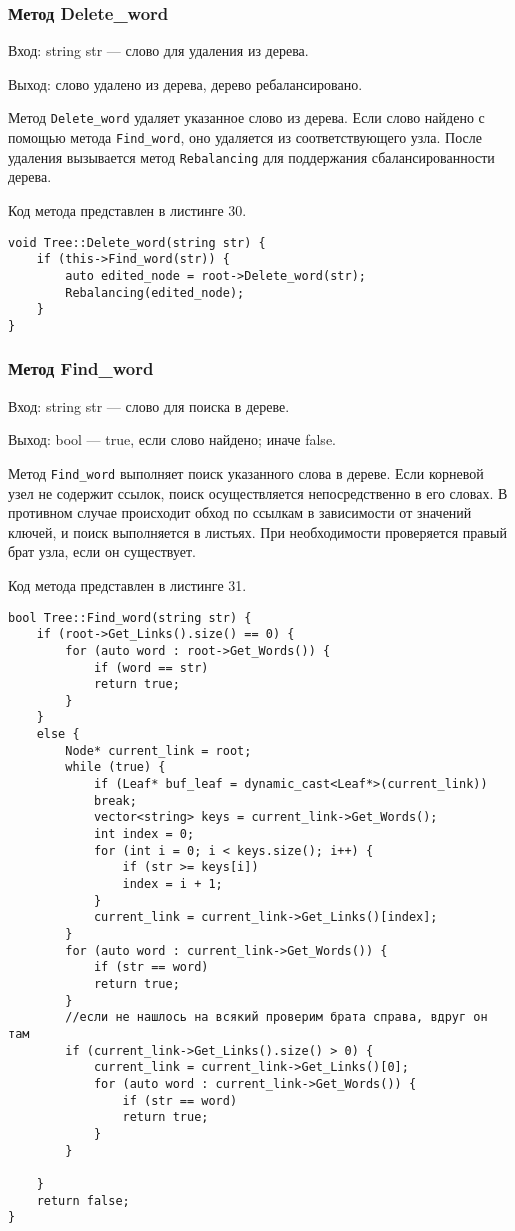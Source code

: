 \documentclass[10pt,a4paper,final]{article} %
\begin{document}
\subsubsection{Метод Delete\_word} 
Вход: string str — слово для удаления из дерева. \par
Выход: слово удалено из дерева, дерево ребалансировано. \par
\par Метод \texttt{Delete\_word} удаляет указанное слово из дерева. Если слово найдено с помощью метода \texttt{Find\_word}, оно удаляется из соответствующего узла. После удаления вызывается метод \texttt{Rebalancing} для поддержания сбалансированности дерева.

Код метода представлен в листинге 30. \begin{lstlisting}[label=deleteWordTreeMethod, caption = Метод Delete\_word для класса Tree] 
void Tree::Delete_word(string str) {
	if (this->Find_word(str)) {
		auto edited_node = root->Delete_word(str);
		Rebalancing(edited_node);
	}
}\end{lstlisting}


\subsubsection{Метод Find\_word} 
Вход: string str — слово для поиска в дереве. \par
Выход: bool — true, если слово найдено; иначе false. \par
\par Метод \texttt{Find\_word} выполняет поиск указанного слова в дереве. Если корневой узел не содержит ссылок, поиск осуществляется непосредственно в его словах. В противном случае происходит обход по ссылкам в зависимости от значений ключей, и поиск выполняется в листьях. При необходимости проверяется правый брат узла, если он существует.

Код метода представлен в листинге 31. \begin{lstlisting}[label=findWordTreeMethod, caption = Метод Find\_word для класса Tree] 
bool Tree::Find_word(string str) {
	if (root->Get_Links().size() == 0) {
		for (auto word : root->Get_Words()) {
			if (word == str)
			return true;
		}
	}
	else {
		Node* current_link = root;
		while (true) {
			if (Leaf* buf_leaf = dynamic_cast<Leaf*>(current_link))
			break;
			vector<string> keys = current_link->Get_Words();
			int index = 0;
			for (int i = 0; i < keys.size(); i++) {
				if (str >= keys[i])
				index = i + 1;
			}
			current_link = current_link->Get_Links()[index];
		}
		for (auto word : current_link->Get_Words()) {
			if (str == word)
			return true;
		}
		//если не нашлось на всякий проверим брата справа, вдруг он там
		if (current_link->Get_Links().size() > 0) {
			current_link = current_link->Get_Links()[0];
			for (auto word : current_link->Get_Words()) {
				if (str == word)
				return true;
			}
		}
		
	}
	return false;
}\end{lstlisting}
\end{document}
